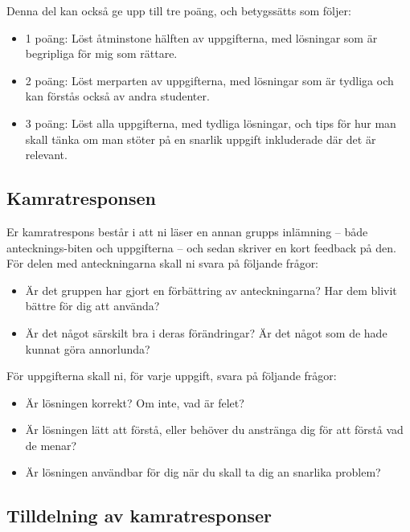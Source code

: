 \documentclass{tufte-handout}
\begin{document}
Denna del kan också ge upp till tre poäng, och betygssätts som följer:
\begin{itemize}
	\item 1 poäng: Löst åtminstone hälften av uppgifterna, med lösningar som är begripliga för mig som rättare.
	\item 2 poäng: Löst merparten av uppgifterna, med lösningar som är tydliga och kan förstås också av andra studenter.
	\item 3 poäng: Löst alla uppgifterna, med tydliga lösningar, och tips för hur man skall tänka om man stöter på en snarlik uppgift inkluderade där det är relevant.
\end{itemize}

\subsection{Kamratresponsen}

Er kamratrespons består i att ni läser en annan grupps inlämning -- både antecknings-biten och uppgifterna -- och sedan skriver en kort feedback på den. För delen med anteckningarna skall ni svara på följande frågor:
\begin{itemize}
	\item Är det gruppen har gjort en förbättring av anteckningarna? Har dem blivit bättre för dig att använda?
	\item Är det något särskilt bra i deras förändringar? Är det något som de hade kunnat göra annorlunda?
\end{itemize}
För uppgifterna skall ni, för varje uppgift, svara på följande frågor:
\begin{itemize}
	\item Är lösningen korrekt? Om inte, vad är felet?
	\item Är lösningen lätt att förstå, eller behöver du anstränga dig för att förstå vad de menar?
	\item Är lösningen användbar för dig när du skall ta dig an snarlika problem?
\end{itemize}

\subsection{Tilldelning av kamratresponser}
\end{document}
